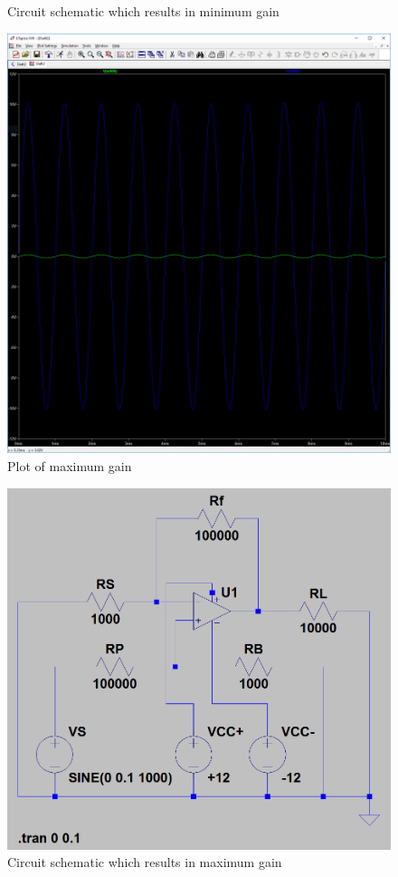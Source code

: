 \documentclass[10pt]{article}
\begin{document}
{\begin{figure}[H]
	\caption{Circuit schematic which results in minimum gain}
\end{figure}
\begin{figure}[H]
	\centering
	\includegraphics[width=\textwidth]{PreLab3a2.PNG}
	\caption{Plot of maximum gain}
\end{figure}
\begin{figure}[H]
	\centering
	\includegraphics[width=\textwidth]{100000.PNG}
	\caption{Circuit schematic which results in maximum gain}
\end{figure}}
\end{document}
